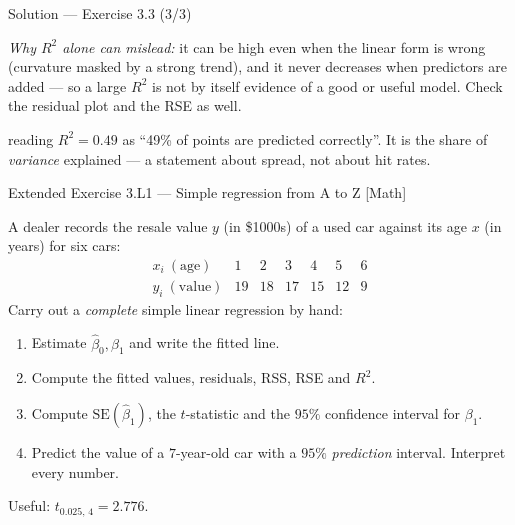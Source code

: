 \documentclass[aspectratio=169,11pt]{beamer}
\begin{document}
\begin{frame}{Solution --- Exercise 3.3 (3/3)}
  \begin{solutionbox}
    \emph{Why $R^2$ alone can mislead:} it can be high even when the
    linear form is wrong (curvature masked by a strong trend), and it
    never decreases when predictors are added --- so a large $R^2$ is
    not by itself evidence of a good or useful model. Check the
    residual plot and the RSE as well.
  \end{solutionbox}
  \begin{mistake}
    reading $R^2=0.49$ as ``49\% of points
    are predicted correctly''. It is the share of \emph{variance}
    explained --- a statement about spread, not about hit rates.
  \end{mistake}
\end{frame}

\begin{frame}{Extended Exercise 3.L1 --- Simple regression from A to Z [Math]}
  \begin{longexercise}
    A dealer records the resale value $y$ (in \$1000s) of a used car
    against its age $x$ (in years) for six cars:
    \[
      \begin{array}{c|cccccc}
        x_i\ (\text{age})   & 1 & 2 & 3 & 4 & 5 & 6\\ \hline
        y_i\ (\text{value}) & 19 & 18 & 17 & 15 & 12 & 9
      \end{array}
    \]
    Carry out a \emph{complete} simple linear regression by hand:
    \begin{enumerate}
      \item Estimate $\hat\beta_0,\hat\beta_1$ and write the fitted line.
      \item Compute the fitted values, residuals, RSS, RSE and $R^2$.
      \item Compute $\mathrm{SE}(\hat\beta_1)$, the $t$-statistic and the
            $95\%$ confidence interval for $\beta_1$.
      \item Predict the value of a $7$-year-old car with a $95\%$
            \emph{prediction} interval. Interpret every number.
    \end{enumerate}
    Useful: $t_{0.025,\,4}=2.776$.
  \end{longexercise}
\end{frame}
\end{document}
